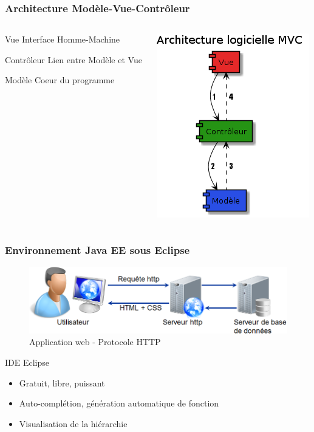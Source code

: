 \begin{frame}
    \frametitle{Architecture Modèle-Vue-Contrôleur}
    \begin{columns}
  		\begin{column}{5cm}
  		\begin{alertblock}{Vue}
  			Interface Homme-Machine
  		\end{alertblock}
  		\begin{exampleblock}{Contrôleur}
  			Lien entre Modèle et Vue
  		\end{exampleblock}
  		\begin{block}{Modèle}
  			Coeur du programme
  		\end{block}
  		\end{column}
  		
  		\begin{column}{5cm}
  			\includegraphics[scale=0.5]{images/MVC.png}
  		\end{column}
  	\end{columns}
\end{frame}

\begin{frame}
    \frametitle{Environnement Java EE sous Eclipse}
    	  \begin{figure}[H]
      \center
      \includegraphics[scale=0.3]{images/protocoleHTTP.png}
      \caption{Application web - Protocole HTTP}
      \end{figure}

	\begin{block}{IDE Eclipse}
		\begin{itemize}
			\item Gratuit, libre, puissant
			\item Auto-complétion, génération automatique de fonction
			\item Visualisation de la hiérarchie
		\end{itemize}
	\end{block}
\end{frame}


